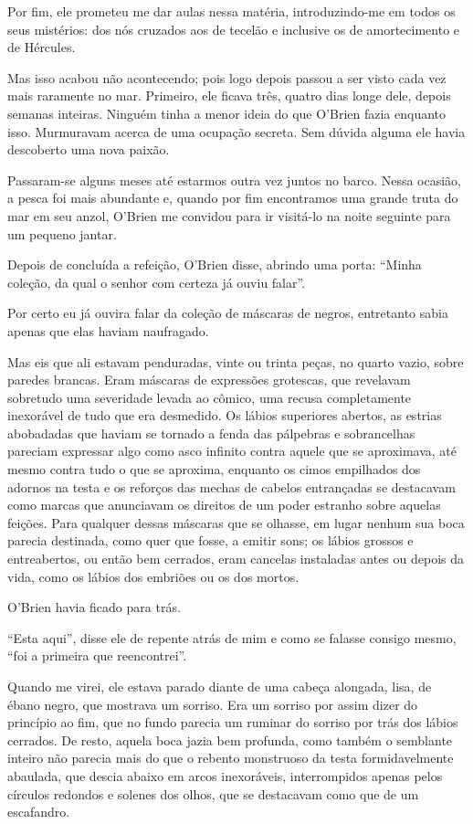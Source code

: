 Por fim, ele prometeu me dar aulas nessa matéria, introduzindo-me em
todos os seus mistérios: dos nós cruzados aos de tecelão e inclusive os
de amortecimento e de Hércules.

Mas isso acabou não acontecendo; pois logo depois passou a ser visto
cada vez mais raramente no mar. Primeiro, ele ficava três, quatro dias
longe dele, depois semanas inteiras. Ninguém tinha a menor ideia do que
O'Brien fazia enquanto isso. Murmuravam acerca de uma ocupação secreta.
Sem dúvida alguma ele havia descoberto uma nova paixão.

Passaram-se alguns meses até estarmos outra vez juntos no barco. Nessa
ocasião, a pesca foi mais abundante e, quando por fim encontramos uma
grande truta do mar em seu anzol, O'Brien me convidou para ir visitá-lo
na noite seguinte para um pequeno jantar.

Depois de concluída a refeição, O'Brien disse, abrindo uma porta:
``Minha coleção, da qual o senhor com certeza já ouviu falar''.

Por certo eu já ouvira falar da coleção de máscaras de negros,
entretanto sabia apenas que elas haviam naufragado.

Mas eis que ali estavam penduradas, vinte ou trinta peças, no quarto
vazio, sobre paredes brancas. Eram máscaras de expressões grotescas, que
revelavam sobretudo uma severidade levada ao cômico, uma recusa
completamente inexorável de tudo que era desmedido. Os lábios superiores
abertos, as estrias abobadadas que haviam se tornado a fenda das
pálpebras e sobrancelhas pareciam expressar algo como asco infinito
contra aquele que se aproximava, até mesmo contra tudo o que se
aproxima, enquanto os cimos empilhados dos adornos na testa e os
reforços das mechas de cabelos entrançadas se destacavam como marcas que
anunciavam os direitos de um poder estranho sobre aquelas feições. Para
qualquer dessas máscaras que se olhasse, em lugar nenhum sua boca
parecia destinada, como quer que fosse, a emitir sons; os lábios grossos
e entreabertos, ou então bem cerrados, eram cancelas instaladas antes ou
depois da vida, como os lábios dos embriões ou os dos mortos.

O'Brien havia ficado para trás.

``Esta aqui'', disse ele de repente atrás de mim e como se falasse
consigo mesmo, ``foi a primeira que reencontrei''.

Quando me virei, ele estava parado diante de uma cabeça alongada, lisa,
de ébano negro, que mostrava um sorriso. Era um sorriso por assim dizer
do princípio ao fim, que no fundo parecia um ruminar do sorriso por trás
dos lábios cerrados. De resto, aquela boca jazia bem profunda, como
também o semblante inteiro não parecia mais do que o rebento monstruoso
da testa formidavelmente abaulada, que descia abaixo em arcos
inexoráveis, interrompidos apenas pelos círculos redondos e solenes dos
olhos, que se destacavam como que de um escafandro.

